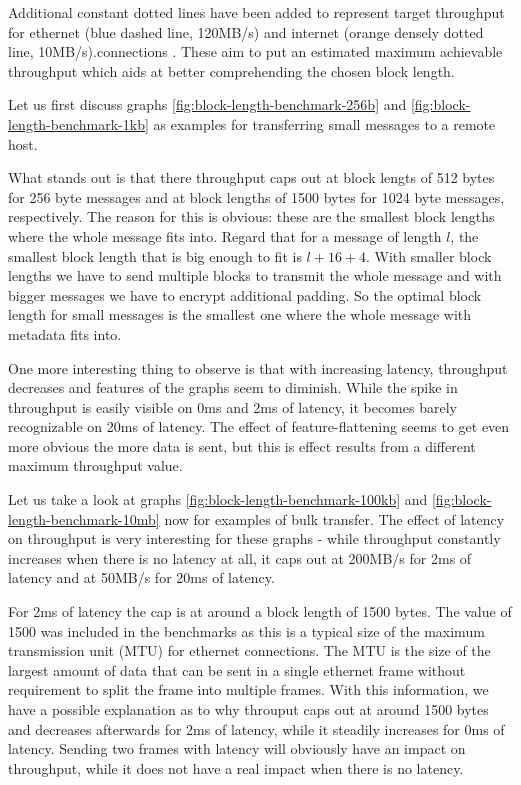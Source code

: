 Additional constant dotted lines have been added to represent target throughput for ethernet (blue dashed line, 120MB/s) and internet (orange densely dotted line, 10MB/s).connections .
These aim to put an estimated maximum achievable throughput which aids at better comprehending the chosen block length.

\medskip

Let us first discuss graphs \ref{fig:block-length-benchmark-256b} and \ref{fig:block-length-benchmark-1kb} as examples for transferring small messages to a remote host.

What stands out is that there throughput caps out at block lengts of 512 bytes for 256 byte messages and at block lengths of 1500 bytes for 1024 byte messages, respectively.
The reason for this is obvious: these are the smallest block lengths where the whole message fits into.
Regard that for a message of length $l$, the smallest block length that is big enough to fit is $l + 16 + 4$.
With smaller block lengths we have to send multiple blocks to transmit the whole message and with bigger messages we have to encrypt additional padding.
So the optimal block length for small messages is the smallest one where the whole message with metadata fits into.

One more interesting thing to observe is that with increasing latency, throughput decreases and features of the graphs seem to diminish.
While the spike in throughput is easily visible on 0ms and 2ms of latency, it becomes barely recognizable on 20ms of latency.
The effect of feature-flattening seems to get even more obvious the more data is sent, but this is effect results from a different maximum throughput value.

Let us take a look at graphs \ref{fig:block-length-benchmark-100kb} and \ref{fig:block-length-benchmark-10mb} now for examples of bulk transfer.
The effect of latency on throughput is very interesting for these graphs - while throughput constantly increases when there is no latency at all, it caps out at 200MB/s for 2ms of latency and at 50MB/s for 20ms of latency.

For 2ms of latency the cap is at around a block length of 1500 bytes.
The value of 1500 was included in the benchmarks as this is a typical size of the maximum transmission unit (MTU) for ethernet connections.
The MTU is the size of the largest amount of data that can be sent in a single ethernet frame without requirement to split the frame into multiple frames.
With this information, we have a possible explanation as to why throuput caps out at around 1500 bytes and decreases afterwards for 2ms of latency, while it steadily increases for 0ms of latency.
Sending two frames with latency will obviously have an impact on throughput, while it does not have a real impact when there is no latency.

